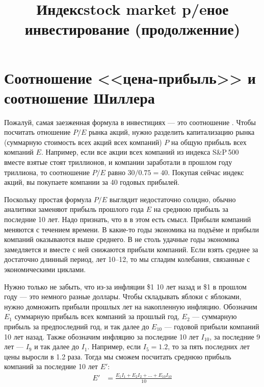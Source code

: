 
\title{Индексstock market p/eное инвестирование (продолженние)}



\section{Соотношение <<цена-прибыль>> и соотношение Шиллера}


Пожалуй, самая заезженная формула в инвестициях --- это соотношение . Чтобы посчитать отношение $P/E$ рынка акций, нужно разделить капитализацию рынка (суммарную стоимость всех акций всех компаний) $P$ на общую прибыль всех компаний $E$. Например, если все акции всех компаний из индекса S\&P\,500 вместе взятые стоят  триллионов, и компании заработали в прошлом году  триллиона, то соотношение $P/E$ равно $30/0.75 = 40$. Покупая сейчас индекс акций, вы покупаете компании за 40 годовых прибылей.

Поскольку простая формула $P/E$ выглядит недостаточно солидно, обычно аналитики заменяют прибыль прошлого года $E$ на среднюю прибыль за последние 10 лет. Надо признать, что в в этом есть смысл. Прибыли компаний меняются с течением времени. В какие-то годы экономика на подъёме и прибыли компаний оказываются выше среднего. В не столь удачные годы экономика замедляется и вместе с ней снижаются прибыли компаний. Если взять среднее за достаточно длинный период, лет 10--12, то мы сгладим колебания, связанные с экономическими циклами.

Нужно только не забыть, что из-за инфляции \$1 10 лет назад и \$1 в прошлом году --- это немного разные доллары. Чтобы складывать яблоки с яблоками, нужно домножить прибыли прошлых лет на накопленную инфляцию. Обозначим $E_{1}$ суммарную прибыль всех компаний за прошлый год, $E_2$ --- суммарную прибыль за предпоследний год, и так далее до $E_{10}$ --- годовой прибыли компаний 10 лет назад. Также обозначим инфляцию за последние 10 лет $I_{10}$, за последние 9 лет --- $I_9$ и так далее до $I_1$. Например, если $I_5=1.2$, то за пять последних лет цены выросли в 1.2 раза. Тогда мы сможем посчитать среднюю прибыль компаний за последние 10 лет  $E'$:
\begin{align}
E' &= \frac{E_1I_1 + E_2I_2 + ... + E_{10}I_{10}}{10}
\end{align}

